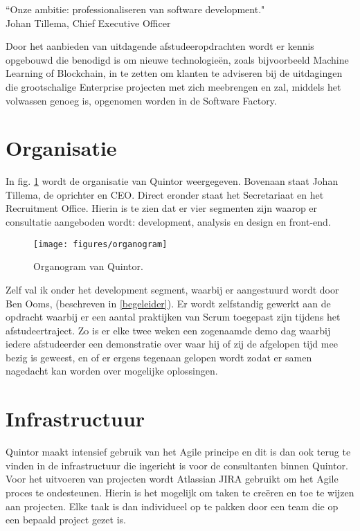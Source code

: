 \begin{formal}
  \label{visie}
  ``Onze ambitie: professionaliseren van software development."
  \\ Johan Tillema, Chief Executive Officer
\end{formal}

Door het aanbieden van uitdagende afstudeeropdrachten wordt er kennis opgebouwd die benodigd is om nieuwe technologieën, zoals bijvoorbeeld Machine Learning of Blockchain, in te zetten om klanten te adviseren bij de uitdagingen die grootschalige Enterprise projecten met zich meebrengen en zal, middels het volwassen genoeg is, opgenomen worden in de Software Factory.

\section{Organisatie}
In fig. \ref{organogram} wordt de organisatie van Quintor weergegeven. Bovenaan staat Johan Tillema, de oprichter en CEO. Direct eronder staat het Secretariaat en het Recruitment Office. Hierin is te zien dat er vier segmenten zijn waarop er consultatie aangeboden wordt: development, analysis en design en front-end.

\begin{figure}[h]
  \texttt{[image: figures/organogram]}
  \caption{Organogram van Quintor.}
  \label{organogram}
\end{figure}

\newpage
Zelf val ik onder het development segment, waarbij er aangestuurd wordt door Ben Ooms, (beschreven in \ref{begeleider}). Er wordt zelfstandig gewerkt aan de opdracht waarbij er een aantal praktijken van Scrum toegepast zijn tijdens het afstudeertraject. Zo is er elke twee weken een zogenaamde demo dag waarbij iedere afstudeerder een demonstratie over waar hij of zij de afgelopen tijd mee bezig is geweest, en of er ergens tegenaan gelopen wordt zodat er samen nagedacht kan worden over mogelijke oplossingen.

\section{Infrastructuur}
\label{organisatie:infrastructuur}

Quintor maakt intensief gebruik van het Agile principe en dit is dan ook terug te vinden in de infrastructuur die ingericht is voor de consultanten binnen Quintor. Voor het uitvoeren van projecten wordt Atlassian JIRA gebruikt om het Agile proces te ondesteunen. Hierin is het mogelijk om taken te creëren en toe te wijzen aan projecten. Elke taak is dan individueel op te pakken door een team die op een bepaald project gezet is. 

